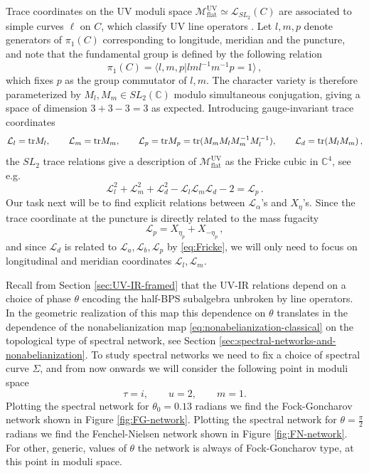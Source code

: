 \documentclass{article}
\numberwithin{equation}{section}
\newcommand{\IC}{\mathbb{C}}
\renewcommand{\flat}{\mathrm{flat}}
\def\be{\begin{equation}}
\def\ee{\end{equation}}
\def\IC{{\mathbb{C}}}
\def\CL{\mathcal{L}}
\def\CM{{\mathcal{M}}}
\def\tr{{\rm{tr}}}
\begin{document}
Trace coordinates on the UV moduli space $\CM_{\flat}^{\text{UV}}\simeq \CL_{SL_2}(C)$ are associated to simple curves $\ell$ on $C$, which classify UV line operators \cite{Drukker:2009tz}. 
Let $l,m,p$ denote generators of $\pi_1(C)$ corresponding to longitude, meridian and the puncture, and note that the fundamental group is defined by the following relation
\be\label{eq:fund-group}
	\pi_1(C) = \langle l,m,p| lml^{-1}m^{-1} p=1\rangle\,,
\ee
which fixes $p$ as the group commutator of $l,m$. 
The character variety is therefore parameterized by $M_l, M_m\in SL_2(\IC)$ modulo simultaneous conjugation, giving a space of dimension $3+3-3=3$ as expected.
Introducing gauge-invariant trace coordinates
\be\label{eq:sl2-trace-coordinates}
	\CL_{l} = \tr M_l,\qquad
	\CL_{m} = \tr M_m, \qquad
	\CL_{p} = \tr M_p = \tr (M_m M_l M_m^{-1} M_l^{-1}), \qquad
	\CL_{d} = \tr (M_l M_m)\,,
\ee
the $SL_2$ trace relations give a description of $\CM_{\flat}^{\text{UV}}$ as the Fricke cubic in $\IC^4$, see e.g. \cite{goldman2009trace}
\be\label{eq:Fricke}
	\CL_{l}^2 +\CL_{m}^2+\CL_{d}^2 - \CL_{l}\CL_{m}\CL_{d}-2 = \CL_p\,.
\ee
Our task next will be to find explicit relations between $\CL_{\alpha}$'s and $X_\eta$'s.
Since the trace coordinate at the puncture is directly related to the mass fugacity
\be
	\CL_p = X_{\eta_p}+X_{-\eta_p}\,,
\ee
and since $\CL_d$ is related to $\CL_{a}, \CL_{b}, \CL_{p}$ by \eqref{eq:Fricke}, we will only need to focus on longitudinal and meridian coordinates $\CL_{l}, \CL_{m}$. 



Recall from Section \ref{sec:UV-IR-framed} that the UV-IR relations depend on a choice of phase $\theta$ encoding the half-BPS subalgebra unbroken by line operators.
In the geometric realization of this map this dependence on $\theta$ translates in the dependence of the nonabelianization map \eqref{eq:nonabelianization-classical} on the topological type of spectral network, see Section \ref{sec:spectral-networks-and-nonabelianization}.
To study spectral networks we need to fix a choice of spectral curve $\Sigma$, and from now onwards we will consider the following point in moduli space
\be\label{eq:moduli-choice}
	\tau=i, \qquad
	u=2, \qquad
	m=1.
\ee
Plotting the spectral network for $\theta_0= 0.13$ radians we find the Fock-Goncharov network shown in Figure \ref{fig:FG-network}.
Plotting the spectral network for $\theta= \frac{\pi}{2}$ radians we find the Fenchel-Nielsen network shown in Figure \ref{fig:FN-network}.
For other, generic, values of $\theta$ the network is always of Fock-Goncharov type, at this point in moduli space.
\end{document}
